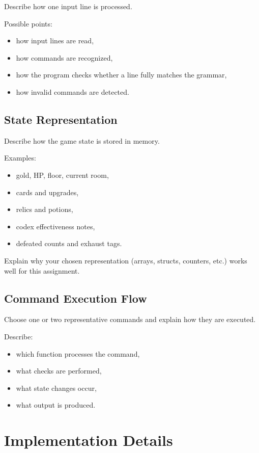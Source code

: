 \documentclass[a4paper,12pt]{article}
\begin{document}
Describe how one input line is processed.

Possible points:
\begin{itemize}[leftmargin=1.5em]
\item how input lines are read,
\item how commands are recognized,
\item how the program checks whether a line fully matches the grammar,
\item how invalid commands are detected.
\end{itemize}

\subsection{State Representation}

Describe how the game state is stored in memory.

Examples:
\begin{itemize}[leftmargin=1.5em]
\item gold, HP, floor, current room,
\item cards and upgrades,
\item relics and potions,
\item codex effectiveness notes,
\item defeated counts and exhaust tags.
\end{itemize}

Explain why your chosen representation (arrays, structs, counters, etc.) works well for this assignment.

\subsection{Command Execution Flow}

Choose one or two representative commands and explain how they are executed.

Describe:
\begin{itemize}[leftmargin=1.5em]
\item which function processes the command,
\item what checks are performed,
\item what state changes occur,
\item what output is produced.
\end{itemize}

\section{Implementation Details}
\end{document}
